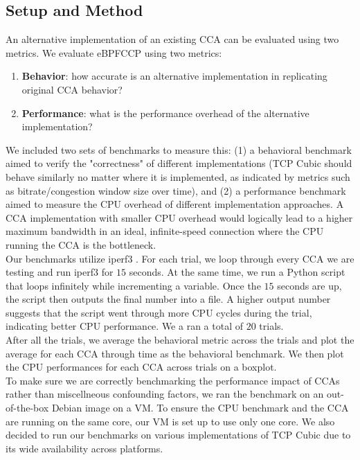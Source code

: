 \documentclass[../main.tex]{subfiles}
\begin{document}
\subsection{Setup and Method}
An alternative implementation of an existing CCA can be evaluated using two metrics.
We evaluate eBPFCCP using two metrics:
\begin{enumerate}
    \item {\bf Behavior}: how accurate is an alternative implementation in replicating original CCA behavior?
    \item {\bf Performance}: what is the performance overhead of the alternative implementation?
\end{enumerate}

We included two sets of benchmarks to measure this: (1) a behavioral benchmark aimed to verify the "correctness" of different implementations (TCP Cubic should behave similarly no matter where it is implemented, as indicated by metrics such as bitrate/congestion window size over time), and (2) a performance benchmark aimed to measure the CPU overhead of different implementation approaches. A CCA implementation with smaller CPU overhead would logically lead to a higher maximum bandwidth in an ideal, infinite-speed connection where the CPU running the CCA is the bottleneck. \\
Our benchmarks utilize iperf3 \cite{iperf}. For each trial, we loop through every CCA we are testing and run iperf3 for $15$ seconds. At the same time, we run a Python script that loops infinitely while incrementing a variable. Once the $15$ seconds are up, the script then outputs the final number into a file. A higher output number suggests that the script went through more CPU cycles during the trial, indicating better CPU performance. We a ran a total of $20$ trials. \\
After all the trials, we average the behavioral metric across the trials and plot the average for each CCA through time as the behavioral benchmark. We then plot the CPU performances for each CCA across trials on a boxplot. \\
To make sure we are correctly benchmarking the performance impact of CCAs rather than miscellneous confounding factors, we ran the benchmark on an out-of-the-box Debian image on a VM. To ensure the CPU benchmark and the CCA are running on the same core, our VM is set up to use only one core. We also decided to run our benchmarks on various implementations of TCP Cubic due to its wide availability across platforms.
\end{document}
